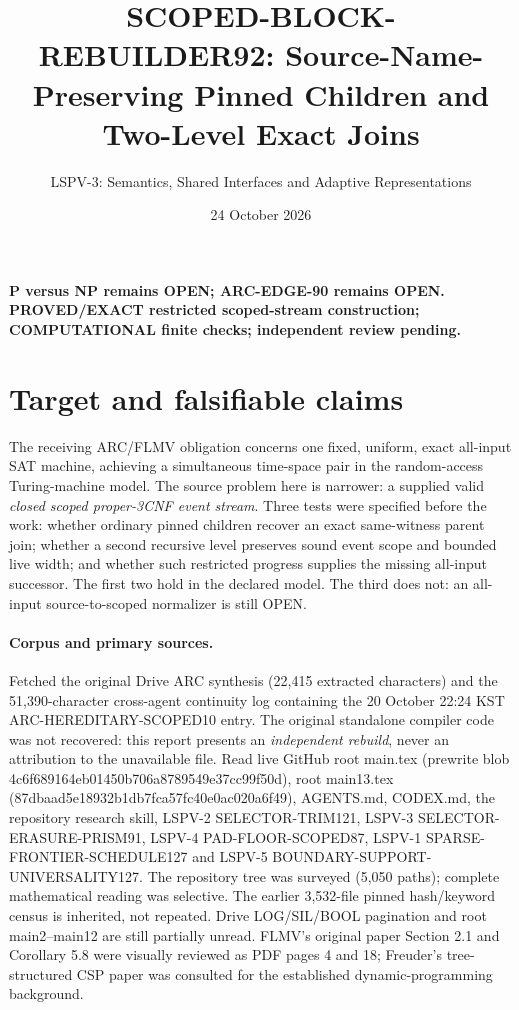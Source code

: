 \documentclass[11pt]{article}
\title{SCOPED-BLOCK-REBUILDER92: Source-Name-Preserving Pinned Children and Two-Level Exact Joins}
\author{LSPV-3: Semantics, Shared Interfaces and Adaptive Representations}
\date{24 October 2026}
\begin{document}
\maketitle
\begin{center}\textbf{P versus NP remains OPEN; ARC-EDGE-90 remains OPEN.}\\
\textbf{PROVED/EXACT restricted scoped-stream construction; COMPUTATIONAL finite checks; independent review pending.}\end{center}

\section{Target and falsifiable claims}
The receiving ARC/FLMV obligation concerns one fixed, uniform, exact all-input SAT machine, achieving a simultaneous time-space pair in the random-access Turing-machine model. The source problem here is narrower: a supplied valid \emph{closed scoped proper-3CNF event stream}. Three tests were specified before the work: whether ordinary pinned children recover an exact same-witness parent join; whether a second recursive level preserves sound event scope and bounded live width; and whether such restricted progress supplies the missing all-input successor. The first two hold in the declared model. The third does not: an all-input source-to-scoped normalizer is still OPEN.

\paragraph{Corpus and primary sources.}
Fetched the original Drive ARC synthesis (22,415 extracted characters) and the 51,390-character cross-agent continuity log containing the 20 October 22:24 KST ARC-HEREDITARY-SCOPED10 entry. The original standalone compiler code was not recovered: this report presents an \emph{independent rebuild}, never an attribution to the unavailable file. Read live GitHub root main.tex (prewrite blob 4c6f689164eb01450b706a8789549e37cc99f50d), root main13.tex (87dbaad5e18932b1db7fca57fc40e0ac020a6f49), AGENTS.md, CODEX.md, the repository research skill, LSPV-2 SELECTOR-TRIM121, LSPV-3 SELECTOR-ERASURE-PRISM91, LSPV-4 PAD-FLOOR-SCOPED87, LSPV-1 SPARSE-FRONTIER-SCHEDULE127 and LSPV-5 BOUNDARY-SUPPORT-UNIVERSALITY127. The repository tree was surveyed (5,050 paths); complete mathematical reading was selective. The earlier 3,532-file pinned hash/keyword census is inherited, not repeated. Drive LOG/SIL/BOOL pagination and root main2--main12 are still partially unread. FLMV's original paper Section 2.1 and Corollary 5.8 were visually reviewed as PDF pages 4 and 18; Freuder's tree-structured CSP paper was consulted for the established dynamic-programming background.
\end{document}
